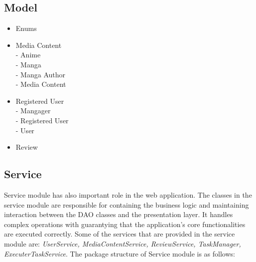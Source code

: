 \subsection*{Model}
\begin{itemize}
    \item Enums
    \item Media Content \\
    - Anime\\
    - Manga \\
    - Manga Author \\
    - Media Content
    \item Registered User\\
    - Mangager\\
    - Registered User\\
    - User
    \item Review 
\end{itemize}

\subsection*{Service}
Service module has also important role in the web application. The classes in the service module are responsible for containing
the business logic and maintaining interaction between the DAO classes and the presentation layer. 
It handles complex operations with guarantying that the application's core functionalities are executed correctly. Some of the services
that are provided in the service module are: \textit{UserService, MediaContentService, ReviewService, TaskManager, ExecuterTaskService}. The 
package structure of Service module is as follows:

